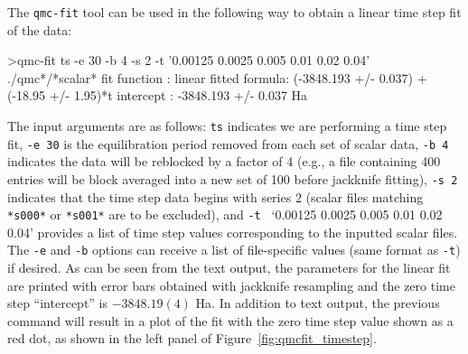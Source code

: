 The \texttt{qmc-fit} tool can be used in the following way to obtain
a linear time step fit of the data:
\begin{shade}
>qmc-fit ts -e 30 -b 4 -s 2 -t '0.00125 0.0025 0.005 0.01 0.02 0.04' ./qmc*/*scalar*
fit function  : linear
fitted formula: (-3848.193 +/- 0.037) + (-18.95 +/- 1.95)*t
intercept     : -3848.193 +/- 0.037  Ha
\end{shade}
The input arguments are as follows: \texttt{ts} indicates we are
performing a time step fit, \texttt{-e 30} is the equilibration period
removed from each set of scalar data, \texttt{-b 4} indicates the data
will be reblocked by a factor of 4 (e.g., a file containing 400 
entries will be block averaged into a new set of 100 before jackknife
fitting), \texttt{-s 2} indicates that the time step data begins with
series 2 (scalar files matching \texttt{*s000*} or \texttt{*s001*} are
to be excluded), and \texttt{-t } `0.00125 0.0025 0.005 0.01 0.02 0.04' provides a list of time step values corresponding to the inputted scalar
files.  The \texttt{-e} and \texttt{-b} options can receive a
list of file-specific values (same format as \texttt{-t}) if desired.
As can be seen from the text output, the parameters for the linear fit
are printed with error bars obtained with jackknife resampling and
the zero time step ``intercept'' is $-3848.19(4)$ Ha.  In addition to
text output, the previous command will result in a plot of the fit with
the zero time step value shown as a red dot, as shown in the left
panel of Figure~\ref{fig:qmcfit_timestep}.

